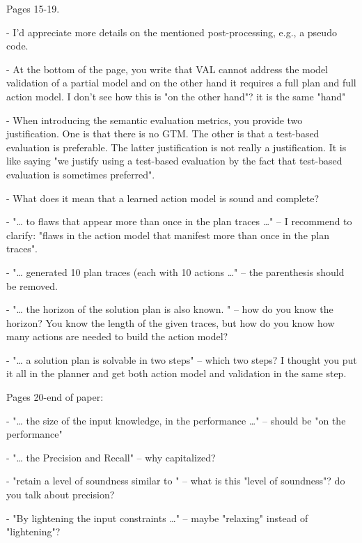 \documentclass{article}
\begin{document}
\begin{mdframed}[hidealllines=true,backgroundcolor=gray!20]
Pages 15-19.

-          I'd appreciate more details on the mentioned post-processing, e.g., a pseudo code.

-          At the bottom of the page, you write that VAL cannot address the model validation of a partial model and on the other hand it requires a full plan and full action model. I don't see how this is "on the other hand"? it is the same "hand"

-          When introducing the semantic evaluation metrics, you provide two justification. One is that there is no GTM. The other is that a test-based evaluation is preferable. The latter justification is not really a justification. It is like saying "we justify using a test-based evaluation by the fact that test-based evaluation is sometimes preferred".

-          What does it mean that a learned action model is sound and complete?

-          "… to flaws that appear more than once in the plan traces …" – I recommend to clarify: "flaws in the action model that manifest more than once in the plan traces".

-          "… generated 10 plan traces (each with 10 actions …" – the parenthesis should be removed.

-          "… the horizon of the solution plan is also known. " – how do you know the horizon? You know the length of the given traces, but how do you know how many actions are needed to build the action model?

-          "… a solution plan is solvable in two steps" – which two steps? I thought you put it all in the planner and get both action model and validation in the same step.
\end{mdframed}


\begin{mdframed}[hidealllines=true,backgroundcolor=gray!20]
   Pages 20-end of paper:

-          "… the size of the input knowledge, in the performance …" – should be "on the performance"

-          "… the Precision and Recall" – why capitalized?

-          "retain a level of soundness similar to " – what is this "level of soundness"? do you talk about precision?

-          "By lightening the input constraints …" – maybe "relaxing" instead of "lightening"?
\end{mdframed}
\end{document}
